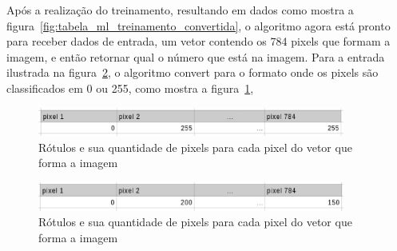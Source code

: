 Após a realização do treinamento, resultando em dados como mostra a
figura~\ref{fig:tabela_ml_treinamento_convertida}, o algoritmo agora está pronto para
receber dados de entrada, um vetor contendo os 784 pixels que formam a imagem, e então
retornar qual o número que está na imagem. Para a entrada ilustrada na
figura~\ref{fig:bayes_dado_entrada}, o algoritmo convert para o formato onde os
pixels são classificados em 0 ou 255, como mostra a figura~\ref{fig:bayes_dado_entrada_convertida},

\begin{figure}[h]
  \centering
  \includegraphics[width=0.9\textwidth]{figuras/bayes_dado_entrada_convertida.eps}
  \caption{Rótulos e sua quantidade de pixels para cada pixel do vetor que forma a imagem}
  \label{fig:bayes_dado_entrada_convertida}
\end{figure}

\begin{figure}[h]
  \centering
  \includegraphics[width=0.9\textwidth]{figuras/bayes_dado_entrada.eps}
  \caption{Rótulos e sua quantidade de pixels para cada pixel do vetor que forma a imagem}
  \label{fig:bayes_dado_entrada}
\end{figure}

